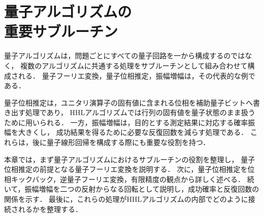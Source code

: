 \newpage
\chapter[量子アルゴリズムの重要サブルーチン]
        {量子アルゴリズムの\\重要サブルーチン}
\label{chap:quantum-subroutines}

量子アルゴリズムは，問題ごとにすべての量子回路を一から構成するのではなく，
複数のアルゴリズムに共通する処理をサブルーチンとして組み合わせて構成される．
量子フーリエ変換，量子位相推定，振幅増幅は，その代表的な例である\cite{shimada2020}．

量子位相推定は，ユニタリ演算子の固有値に含まれる位相を補助量子ビットへ書き出す処理であり，
HHLアルゴリズムでは行列の固有値を量子状態のまま扱うために用いられる．
一方，振幅増幅は，目的とする測定結果に対応する確率振幅を大きくし，
成功結果を得るために必要な反復回数を減らす処理である．
これらは，後に量子線形回帰を構成する際にも重要な役割を持つ．

本章では，まず量子アルゴリズムにおけるサブルーチンの役割を整理し，
量子位相推定の前提となる量子フーリエ変換を説明する．
次に，量子位相推定を位相キックバック，逆量子フーリエ変換，有限精度の観点から詳しく述べる．
続いて，振幅増幅を二つの反射からなる回転として説明し，成功確率と反復回数の関係を示す．
最後に，これらの処理がHHLアルゴリズムの内部でどのように接続されるかを整理する．







